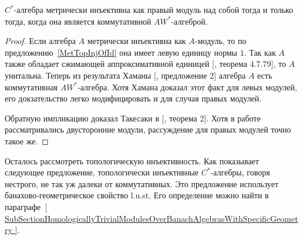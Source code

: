 \begin{proposition}\label{MetInjCStarAlgCharac} $C^*$-алгебра
метрически инъективна как правый модуль над собой тогда и только тогда, когда
она является коммутативной $AW^*$-алгеброй.
\end{proposition}
\begin{proof} Если алгебра $A$ метрически инъективна как $A$-модуль, то по
предложению~\ref{MetTopInjOfId} она имеет левую единицу нормы $1$. Так как $A$
также обладает сжимающей аппроксимативной единицей  [\cite{HelBanLocConvAlg},
теорема 4.7.79], то $A$ унитальна. Теперь из результата Хаманы
[\cite{HamInjEnvBanMod}, предложение 2] алгебра $A$ есть коммутативная
$AW^*$-алгебра. Хотя Хамана доказал этот факт для левых модулей, его
докзательство легко модифицировать и для случая правых модулей.

Обратную импликацию доказал Такесаки в [\cite{TakHanBanThAndJordDecomOfModMap},
теорема 2]. Хотя в работе рассматривались двусторонние модули, рассуждение для
правых модулей точно такое же.
\end{proof}

Осталось рассмотреть топологическую инъективность. Как показывает следующее
предложение, топологически инъективные $C^*$-алгебры, говоря нестрого, не так уж
далеки от коммутативных. Это предложение использует банахово-геометрическое
свойство l.u.st. Его определение можно найти в
параграфе~\ref{
    SubSectionHomologicallyTrivialModulesOverBanachAlgebrasWithSpecificGeometry
}.

